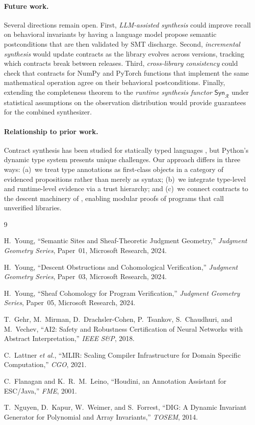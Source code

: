 \documentclass[11pt]{article}
\newcommand{\Syn}{\mathsf{Syn}}            %
\newcommand{\RunObs}{\mathcal{R}}          %
\newcommand{\SynR}{\Syn_{\RunObs}}         %
\begin{document}
\paragraph{Future work.}
Several directions remain open.  First, \emph{LLM-assisted synthesis}
could improve recall on behavioral invariants by having a language
model propose semantic postconditions that are then validated by SMT
discharge.  Second, \emph{incremental synthesis} would update contracts
as the library evolves across versions, tracking which contracts break
between releases.  Third, \emph{cross-library consistency} could check
that contracts for NumPy and PyTorch functions that implement the same
mathematical operation agree on their behavioral postconditions.
Finally, extending the completeness theorem to the \emph{runtime
synthesis functor} $\SynR$ under statistical assumptions on the
observation distribution would provide guarantees for the combined
synthesizer.

\paragraph{Relationship to prior work.}
Contract synthesis has been studied for statically typed languages
\cite{Flanagan02Houdini,Nguyen14DIG}, but Python's dynamic type system
presents unique challenges.  Our approach differs in three ways:
(a)~we treat type annotations as first-class objects in a category of
evidenced propositions rather than merely as syntax; (b)~we integrate
type-level and runtime-level evidence via a trust hierarchy; and
(c)~we connect contracts to the descent machinery of \JuGeo{}, enabling
modular proofs of programs that call unverified libraries.


\begin{thebibliography}{9}

H.~Young, ``Semantic Sites and Sheaf-Theoretic Judgment Geometry,''
\textit{Judgment Geometry Series}, Paper~01, Microsoft Research, 2024.

H.~Young, ``Descent Obstructions and Cohomological Verification,''
\textit{Judgment Geometry Series}, Paper~03, Microsoft Research, 2024.

H.~Young, ``Sheaf Cohomology for Program Verification,''
\textit{Judgment Geometry Series}, Paper~05, Microsoft Research, 2024.

T.~Gehr, M.~Mirman, D.~Drachsler-Cohen, P.~Tsankov, S.~Chaudhuri,
and M.~Vechev, ``AI2: Safety and Robustness Certification of Neural
Networks with Abstract Interpretation,''
\textit{IEEE S\&P}, 2018.

C.~Lattner \textit{et al.}, ``MLIR: Scaling Compiler Infrastructure
for Domain Specific Computation,''
\textit{CGO}, 2021.

C.~Flanagan and K.~R.~M.~Leino, ``Houdini, an Annotation Assistant
for ESC/Java,''
\textit{FME}, 2001.

T.~Nguyen, D.~Kapur, W.~Weimer, and S.~Forrest, ``DIG: A Dynamic
Invariant Generator for Polynomial and Array Invariants,''
\textit{TOSEM}, 2014.

\end{thebibliography}
\end{document}
